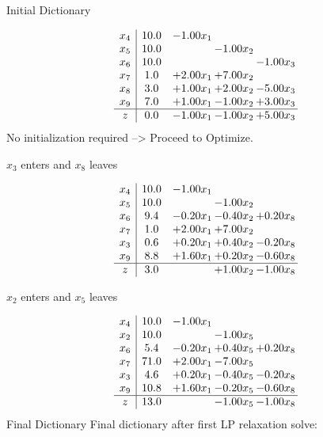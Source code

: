 \documentclass[8pt]{article}
\begin{document}
Initial Dictionary 

\[\begin{array}{c| c c@{\hskip 2pt} c@{\hskip 2pt} c@{\hskip 2pt} }
 x_{4}   &  10.0 & -1.00 x_{1} &    &   \\
 x_{5}   &  10.0  &   & -1.00 x_{2} &   \\
 x_{6}   &  10.0  &    &   & -1.00 x_{3}\\
 x_{7}   &  1.0 & +  2.00 x_{1} & +  7.00 x_{2} &   \\
 x_{8}   &  3.0 & +  1.00 x_{1} & +  2.00 x_{2} & -5.00 x_{3}\\
 x_{9}   &  7.0 & +  1.00 x_{1} & -1.00 x_{2} & +  3.00 x_{3}\\
\hline
z    &  0.0 & -1.00 x_{1} & -1.00 x_{2} & +  5.00 x_{3}\\
\end{array}\]
No initialization required --> Proceed to Optimize. 


 $ x_{3} $ enters and $ x_{8} $ leaves 

 \[\begin{array}{c| c c@{\hskip 2pt} c@{\hskip 2pt} c@{\hskip 2pt} }
 x_{4}   &  10.0 & -1.00 x_{1} &    &   \\
 x_{5}   &  10.0  &   & -1.00 x_{2} &   \\
 x_{6}   &  9.4 & -0.20 x_{1} & -0.40 x_{2} & +  0.20 x_{8}\\
 x_{7}   &  1.0 & +  2.00 x_{1} & +  7.00 x_{2} &   \\
 x_{3}   &  0.6 & +  0.20 x_{1} & +  0.40 x_{2} & -0.20 x_{8}\\
 x_{9}   &  8.8 & +  1.60 x_{1} & +  0.20 x_{2} & -0.60 x_{8}\\
\hline
z    &  3.0  &   & +  1.00 x_{2} & -1.00 x_{8}\\
\end{array}\]


 $ x_{2} $ enters and $ x_{5} $ leaves 

 \[\begin{array}{c| c c@{\hskip 2pt} c@{\hskip 2pt} c@{\hskip 2pt} }
 x_{4}   &  10.0 & -1.00 x_{1} &    &   \\
 x_{2}   &  10.0  &   & -1.00 x_{5} &   \\
 x_{6}   &  5.4 & -0.20 x_{1} & +  0.40 x_{5} & +  0.20 x_{8}\\
 x_{7}   &  71.0 & +  2.00 x_{1} & -7.00 x_{5} &   \\
 x_{3}   &  4.6 & +  0.20 x_{1} & -0.40 x_{5} & -0.20 x_{8}\\
 x_{9}   &  10.8 & +  1.60 x_{1} & -0.20 x_{5} & -0.60 x_{8}\\
\hline
z    &  13.0  &   & -1.00 x_{5} & -1.00 x_{8}\\
\end{array}\]
Final Dictionary
Final dictionary after first LP relaxation solve: 
\end{document}
